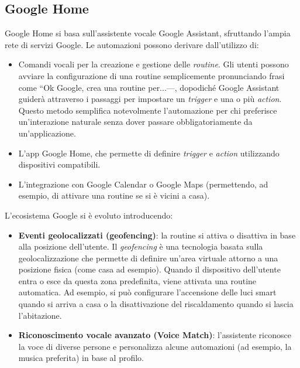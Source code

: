 \subsection{Google Home}
Google Home si basa sull’assistente vocale Google Assistant, sfruttando l’ampia rete di servizi Google. Le automazioni possono derivare dall’utilizzo di:
\begin{itemize}
  \item Comandi vocali per la creazione e gestione delle \emph{routine}. Gli utenti possono avviare la configurazione di una routine semplicemente pronunciando frasi come “Ok Google, crea una routine per...—, dopodiché Google Assistant guiderà attraverso i passaggi per impostare un \emph{trigger} e una o più \emph{action}. Questo metodo semplifica notevolmente l’automazione per chi preferisce un'interazione naturale senza dover passare obbligatoriamente da un'applicazione.
  \item L’app Google Home, che permette di definire \emph{trigger} e \emph{action} utilizzando dispositivi compatibili.
  \item L’integrazione con Google Calendar o Google Maps (permettendo, ad esempio, di attivare una routine se si è vicini a casa).
\end{itemize}


L’ecosistema Google si è evoluto introducendo:
\begin{itemize}
  \item \textbf{Eventi geolocalizzati (geofencing)}: la routine si attiva o disattiva in base alla posizione dell’utente. Il \emph{geofencing} è una tecnologia basata sulla geolocalizzazione che permette di definire un'area virtuale attorno a una posizione fisica (come casa ad esempio). Quando il dispositivo dell’utente entra o esce da questa zona predefinita, viene attivata una routine automatica. Ad esempio, si può configurare l’accensione delle luci smart quando si arriva a casa o la disattivazione del riscaldamento quando si lascia l’abitazione.
  \item \textbf{Riconoscimento vocale avanzato (Voice Match)}: l’assistente riconosce la voce di diverse persone e personalizza alcune automazioni (ad esempio, la musica preferita) in base al profilo.
\end{itemize}




